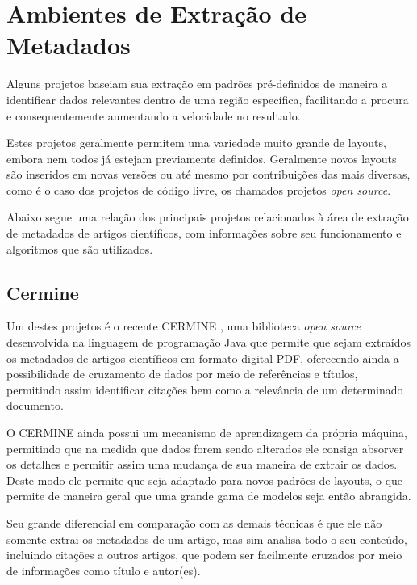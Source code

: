 \section{Ambientes de Extração de Metadados}
\label{sec:environments}

Alguns projetos baseiam sua extração em padrões pré-definidos de maneira a identificar dados relevantes dentro de uma região específica, facilitando a procura e consequentemente aumentando a velocidade no resultado. 

Estes projetos geralmente permitem uma variedade muito grande de layouts, embora nem todos já estejam previamente definidos. Geralmente novos layouts são inseridos em novas versões ou até mesmo por contribuições das mais diversas, como é o caso dos projetos de código livre, os chamados projetos \textit{open source}.

Abaixo segue uma relação dos principais projetos relacionados à área de extração de metadados de artigos científicos, com informações sobre seu funcionamento e algoritmos que são utilizados.

\subsection{Cermine}
\label{ssec:cermine}


Um destes projetos é o recente CERMINE \cite{cermine}, uma biblioteca \textit{open source} desenvolvida na linguagem de programação Java que permite que sejam extraídos os metadados de artigos científicos em formato digital PDF, oferecendo ainda a possibilidade de cruzamento de dados por meio de referências e títulos, permitindo assim identificar citações bem como a relevância de um determinado documento.

O CERMINE ainda possui um mecanismo de aprendizagem da própria máquina, permitindo que na medida que dados forem sendo alterados ele consiga absorver os detalhes e permitir assim uma mudança de sua maneira de extrair os dados. Deste modo ele permite que seja adaptado para novos padrões de layouts, o que permite de maneira geral que uma grande gama de modelos seja então abrangida. 

Seu grande diferencial em comparação com as demais técnicas é que ele não somente extrai os metadados de um artigo, mas sim analisa todo o seu conteúdo, incluindo citações a outros artigos, que podem ser facilmente cruzados por meio de informações como título e autor(es).

